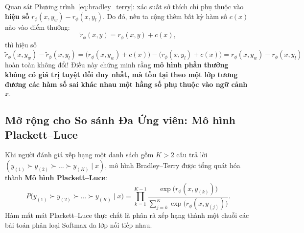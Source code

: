 \begin{remark}
\label{rem:shift_invariance}
Quan sát Phương trình~\eqref{eq:bradley_terry}: xác suất sở thích chỉ phụ thuộc vào \textbf{hiệu số} $r_\phi(x, y_w) - r_\phi(x, y_l)$. Do đó, nếu ta cộng thêm bất kỳ hàm số $c(x)$ nào vào điểm thưởng:
\begin{equation}
    \tilde{r}_\phi(x, y) = r_\phi(x, y) + c(x),
\end{equation}
thì hiệu số $\tilde{r}_\phi(x, y_w) - \tilde{r}_\phi(x, y_l) = \big(r_\phi(x, y_w) + c(x)\big) - \big(r_\phi(x, y_l) + c(x)\big) = r_\phi(x, y_w) - r_\phi(x, y_l)$ hoàn toàn không đổi!
Điều này chứng minh rằng \textbf{mô hình phần thưởng không có giá trị tuyệt đối duy nhất, mà tồn tại theo một lớp tương đương các hàm số sai khác nhau một hằng số phụ thuộc vào ngữ cảnh $x$}.
\end{remark}

\subsection{Mở rộng cho So sánh Đa Ứng viên: Mô hình Plackett--Luce \citep{luce1959individual, plackett1975analysis}}
Khi người đánh giá xếp hạng một danh sách gồm $K > 2$ câu trả lời $(y_{(1)} \succ y_{(2)} \succ \dots \succ y_{(K)} \mid x)$, mô hình Bradley--Terry được tổng quát hóa thành \textbf{Mô hình Plackett--Luce}:
\begin{equation}
    P\big(y_{(1)} \succ y_{(2)} \succ \dots \succ y_{(K)} \mid x\big) = \prod_{k=1}^{K-1} \frac{\exp\big(r_\phi(x, y_{(k)})\big)}{\sum_{j=k}^{K} \exp\big(r_\phi(x, y_{(j)})\big)}.
    \label{eq:plackett_luce}
\end{equation}
Hàm mất mát Plackett--Luce thực chất là phân rã xếp hạng thành một chuỗi các bài toán phân loại Softmax đa lớp nối tiếp nhau.

